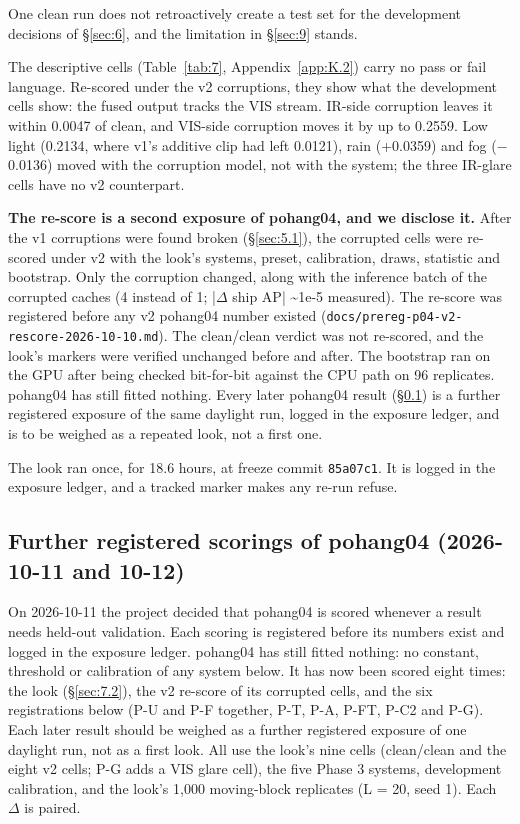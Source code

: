 \documentclass[10pt]{article}
\begin{document}
One clean run does not retroactively create a test set for the development decisions of \S\ref{sec:6}, and the limitation in \S\ref{sec:9} stands.

The descriptive cells (Table~\ref{tab:7}, Appendix~\ref{app:K.2}) carry no pass or fail language. Re-scored under the v2 corruptions, they show what the development cells show: the fused output tracks the VIS stream. IR-side corruption leaves it within 0.0047 of clean, and VIS-side corruption moves it by up to 0.2559. Low light (0.2134, where v1's additive clip had left 0.0121), rain (+0.0359) and fog ($-$0.0136) moved with the corruption model, not with the system; the three IR-glare cells have no v2 counterpart.

\textbf{The re-score is a second exposure of pohang04, and we disclose it.} After the v1 corruptions were found broken (\S\ref{sec:5.1}), the corrupted cells were re-scored under v2 with the look's systems, preset, calibration, draws, statistic and bootstrap. Only the corruption changed, along with the inference batch of the corrupted caches (4 instead of 1; |$\Delta$ ship AP| \textasciitilde{}1e-5 measured). The re-score was registered before any v2 pohang04 number existed (\texttt{docs/\allowbreak{}prereg-p04-v2-rescore-2026-10-10.md}). The clean/clean verdict was not re-scored, and the look's markers were verified unchanged before and after. The bootstrap ran on the GPU after being checked bit-for-bit against the CPU path on 96 replicates. pohang04 has still fitted nothing. Every later pohang04 result (\S\ref{sec:7.3}) is a further registered exposure of the same daylight run, logged in the exposure ledger, and is to be weighed as a repeated look, not a first one.

The look ran once, for 18.6 hours, at freeze commit \texttt{85a07c1}. It is logged in the exposure ledger, and a tracked marker makes any re-run refuse.

\subsection{Further registered scorings of pohang04 (2026-10-11 and 10-12)}\label{sec:7.3}
On 2026-10-11 the project decided that pohang04 is scored whenever a result needs held-out validation. Each scoring is registered before its numbers exist and logged in the exposure ledger. pohang04 has still fitted nothing: no constant, threshold or calibration of any system below. It has now been scored eight times: the look (\S\ref{sec:7.2}), the v2 re-score of its corrupted cells, and the six registrations below (P-U and P-F together, P-T, P-A, P-FT, P-C2 and P-G). Each later result should be weighed as a further registered exposure of one daylight run, not as a first look. All use the look's nine cells (clean/clean and the eight v2 cells; P-G adds a VIS glare cell), the five Phase 3 systems, development calibration, and the look's 1,000 moving-block replicates (L = 20, seed 1). Each $\Delta$ is paired.
\end{document}
